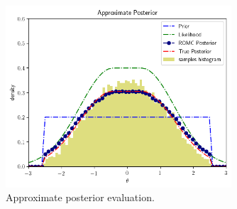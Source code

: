 \begin{figure}[h]
    \begin{center}
      \includegraphics[width=0.75\textwidth]{./Thesis/images/chapter3/example_posterior.png}
    \end{center}
  \caption{Approximate posterior evaluation.}
  \label{fig:approx_posterior}
\end{figure}
